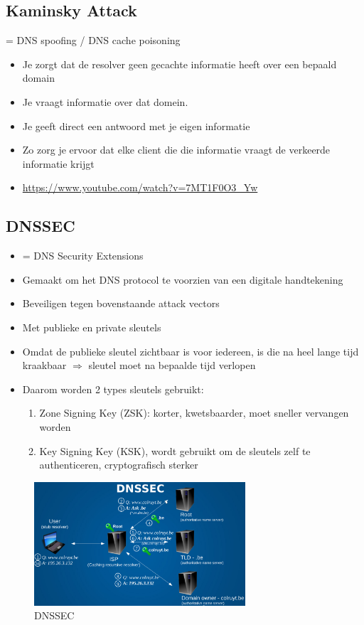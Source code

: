 \documentclass{article}
\begin{document}
\subsection{Kaminsky Attack}

= DNS spoofing / DNS cache poisoning

\begin{itemize}
    \item Je zorgt dat de resolver geen gecachte informatie heeft over een bepaald domain
    \item Je vraagt informatie over dat domein.
    \item Je geeft direct een antwoord met je eigen informatie
    \item Zo zorg je ervoor dat elke client die die informatie vraagt de verkeerde informatie krijgt
    \item \url{https://www.youtube.com/watch?v=7MT1F0O3_Yw}
\end{itemize}

\subsection{DNSSEC}

\begin{itemize}
    \item = DNS Security Extensions
    \item Gemaakt om het DNS protocol te voorzien van een digitale handtekening
    \item Beveiligen tegen bovenstaande attack vectors
    \item Met publieke en private sleutels
    \item Omdat de publieke sleutel zichtbaar is voor iedereen, is die na heel lange tijd kraakbaar $\Rightarrow$ sleutel moet na bepaalde tijd verlopen
    \item Daarom worden 2 types sleutels gebruikt:
    \begin{enumerate}
        \item Zone Signing Key (ZSK): korter, kwetsbaarder, moet sneller vervangen worden
        \item Key Signing Key (KSK), wordt gebruikt om de sleutels zelf te authenticeren, cryptografisch sterker
    \end{enumerate}
\end{itemize}

\begin{figure}[H]
    \centering
    \includegraphics[width=0.7\textwidth]{dnssec.png}
    \caption{DNSSEC}
\end{figure}
\end{document}
